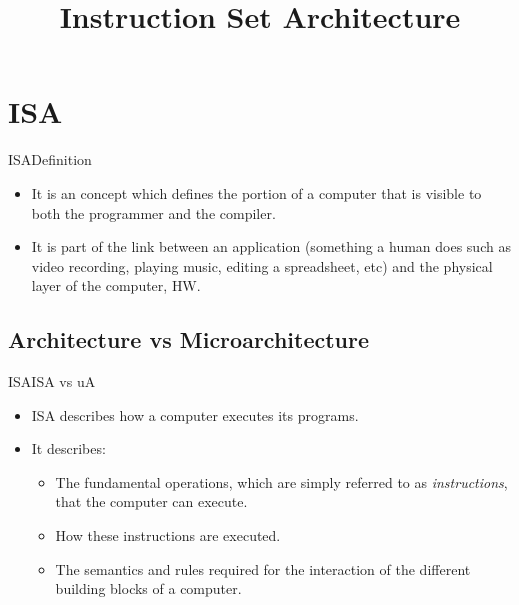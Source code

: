 \documentclass[]{slides}
\title{Instruction Set Architecture}
\begin{document}
\printpdftrue %
\begin{frame} \titlepage \end{frame}


\section{\acl{ISA}}
\begin{frame}{\acl{ISA}}{Definition}
\begin{itemize}
  \item It is an  concept which defines the portion of a computer that is visible to both the programmer and the compiler.
  \item It is part of the link between an application (something a human does such as video recording, playing music, editing a spreadsheet, etc) and the physical layer of the computer, \ie \ac{HW}.
\end{itemize}
\end{frame}

\subsection{Architecture vs Microarchitecture}
\begin{frame}{\acl{ISA}}{\acs{ISA} vs \acs{uA}}
\begin{itemize}
  \item \ac{ISA}  describes how a computer executes its programs. 
  \item It describes:
  \begin{itemize}
    \item The fundamental operations, which are simply referred to as \emph{instructions}, that the computer can execute.
    \item How these instructions are executed.
    \item The semantics and rules required for the interaction of the different building blocks of a computer.
  \end{itemize}      
\end{itemize}
\end{frame}
\end{document}
